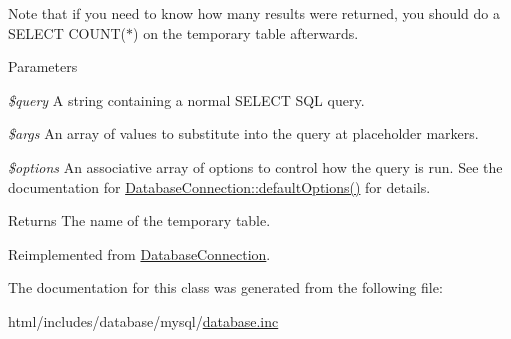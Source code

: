 Note that if you need to know how many results were returned, you should do a SELECT COUNT($\ast$) on the temporary table afterwards.


\begin{DoxyParams}{Parameters}
\item[{\em \$query}]A string containing a normal SELECT SQL query. \item[{\em \$args}]An array of values to substitute into the query at placeholder markers. \item[{\em \$options}]An associative array of options to control how the query is run. See the documentation for \hyperlink{classDatabaseConnection_a190539d6c494ef2d7ac90d21226de5a5}{DatabaseConnection::defaultOptions()} for details.\end{DoxyParams}
\begin{DoxyReturn}{Returns}
The name of the temporary table. 
\end{DoxyReturn}


Reimplemented from \hyperlink{classDatabaseConnection_ae4d9ad286187f493172da04fca77ca8f}{DatabaseConnection}.

The documentation for this class was generated from the following file:\begin{DoxyCompactItemize}
\item 
html/includes/database/mysql/\hyperlink{mysql_2database_8inc}{database.inc}\end{DoxyCompactItemize}

